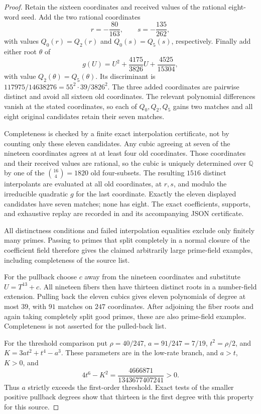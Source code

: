 \begin{proof}
Retain the sixteen coordinates and received values of the rational eight-word
seed.  Add the two rational coordinates
\[
 r=-\frac{80}{163},\qquad s=-\frac{135}{262},
\]
with values $Q_0(r)=Q_2(r)$ and $Q_0(s)=Q_5(s)$, respectively.  Finally add
either root $\theta$ of
\[
 g(U)=U^2+\frac{4175}{3826}U+\frac{4525}{15304},
\]
with value $Q_2(\theta)=Q_5(\theta)$.  Its discriminant is
$117975/14638276=55^2\cdot39/3826^2$.  The three added coordinates are
pairwise distinct and avoid all sixteen old coordinates.  The relevant
polynomial differences vanish at the stated coordinates, so each of
$Q_0,Q_2,Q_5$ gains two matches and all eight original candidates retain their
seven matches.

Completeness is checked by a finite exact interpolation certificate, not by
counting only these eleven candidates.  Any cubic agreeing at seven of the
nineteen coordinates agrees at at least four old coordinates.  Those
coordinates and their received values are rational, so the cubic is uniquely
determined over $\mathbb Q$ by one of the $\binom{16}{4}=1820$ old four-subsets.
The resulting $1516$ distinct interpolants are evaluated at all old
coordinates, at $r,s$, and modulo the irreducible quadratic $g$ for the last
coordinate.  Exactly the eleven displayed candidates have seven matches;
none has eight.  The exact coefficients, supports, and exhaustive replay are
recorded in 
and its accompanying JSON certificate.

All distinctness conditions and failed interpolation equalities exclude only
finitely many primes.  Passing to primes that split completely in a normal
closure of the coefficient field therefore gives the claimed arbitrarily
large prime-field examples, including completeness of the source list.

For the pullback choose $c$ away from the nineteen coordinates and substitute
$U=T^{13}+c$.  All nineteen fibers then have thirteen distinct roots in a
number-field extension.  Pulling back the eleven cubics gives eleven
polynomials of degree at most $39$, with $91$ matches on $247$ coordinates.
After adjoining the fiber roots and again taking completely split good
primes, these are also prime-field examples.  Completeness is not asserted
for the pulled-back list.

For the threshold comparison put $\rho=40/247$, $a=91/247=7/19$,
$t^2=\rho/2$, and $K=3at^2+t^4-a^3$.  These parameters are in the low-rate
branch, and $a>t$, $K>0$, and
\[
 4t^6-K^2=\frac{4666871}{1343677407241}>0.
\]
Thus $a$ strictly exceeds the first-order threshold.  Exact tests of the
smaller positive pullback degrees show that thirteen is the first degree
with this property for this source.
\end{proof}
